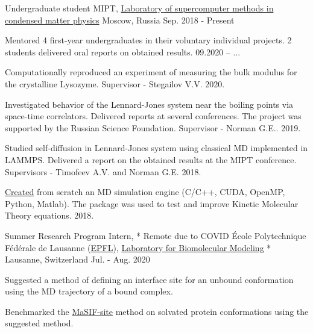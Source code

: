 

\begin{cventries}

  \cventry
    {Undergraduate student} %
    {MIPT, \href{http://en.smcmp.ru/}{Laboratory of supercomputer methods
in condensed matter physics}} %
    {Moscow, Russia} %
    {Sep. 2018 - Present} %
    {
      \begin{cvitems} %
        \item {\textsf{Mentored 4} first-year \textsf{undergraduates} in their voluntary individual projects. 2 students delivered oral reports on obtained results. 09.2020 -- ...}
        \item {Computationally reproduced an experiment of measuring the bulk modulus for the \textsf{crystalline Lysozyme}. Supervisor - Stegailov V.V. 2020.}
        \item {Investigated behavior of the \textsf{Lennard-Jones system} near the boiling points via space-time correlators. Delivered reports at \textsf{several conferences}. The project was supported by the Russian Science Foundation. Supervisor - Norman G.E.. 2019.}
      	\item {Studied self-diffusion in Lennard-Jones system using classical MD implemented in \textsf{LAMMPS}. Delivered a report on the obtained results at the MIPT conference. Supervisors - Timofeev A.V. and Norman G.E. 2018.}
      	\item {\href{https://github.com/PolyachenkoYA/molecules}{Created} from scratch an MD simulation engine (\textsf{C/C++, CUDA, OpenMP, Python, Matlab}). The package was used to test and improve Kinetic Molecular Theory equations.  2018.}
      \end{cvitems}
    }
    
  \cventry
    {Summer Research Program Intern, * Remote due to COVID} %
    {École Polytechnique Fédérale de Lausanne (\href{https://www.epfl.ch/en/}{EPFL}), \hspace{5pt}  \href{https://www.epfl.ch/labs/lbm/}{Laboratory for Biomolecular Modeling}} %
    {* Lausanne, Switzerland} %
    {Jul. - Aug. 2020} %
    {
      \begin{cvitems} %
		\item{Suggested a method of defining an interface site for an unbound conformation using the MD trajectory of a bound complex.}
        \item {Benchmarked the \href{https://www.nature.com/articles/s41592-019-0666-6}{MaSIF-site} method on solvated protein conformations using the suggested method.}
      \end{cvitems}
    }
    

\end{cventries}
